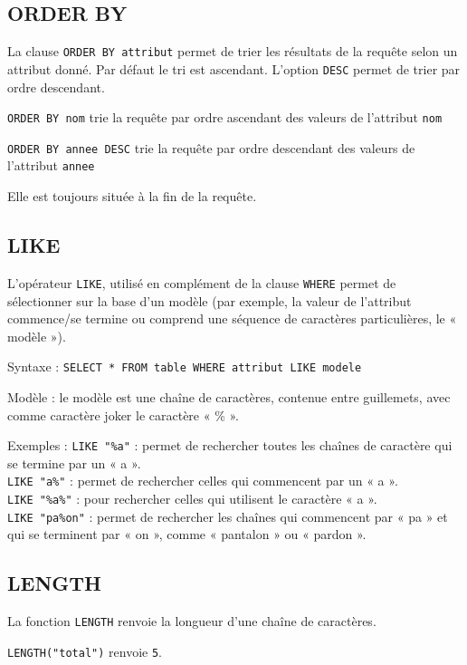 \subsection{ORDER BY}

La clause \verb|ORDER BY attribut| permet de trier les résultats de la requête selon un attribut donné. Par défaut le tri est ascendant. L'option \verb|DESC| permet de trier par ordre descendant.

\verb|ORDER BY nom| trie la requête par ordre ascendant des valeurs de l'attribut \verb|nom|

\verb|ORDER BY annee DESC| trie la requête par ordre descendant des valeurs de l'attribut \verb|annee|

Elle est toujours située à la fin de la requête.

\subsection{LIKE}

L'opérateur \verb|LIKE|, utilisé en complément de la clause \verb|WHERE| permet de sélectionner sur la base d'un modèle (par exemple, la valeur de l'attribut commence/se termine ou comprend une séquence de caractères particulières, le « modèle »). 

Syntaxe : \verb|SELECT * FROM table WHERE attribut LIKE modele|

Modèle : le modèle est une chaîne de caractères, contenue entre guillemets, avec comme caractère joker le caractère « \% ». 

Exemples :
\verb|LIKE "%a"| : permet de rechercher toutes les chaînes de caractère qui se termine par un « a ».\\
\verb|LIKE "a%"| : permet de rechercher celles qui commencent par un « a ».\\
\verb|LIKE "%a%"| : pour rechercher celles qui utilisent le caractère « a ».\\
\verb|LIKE "pa%on"| : permet de rechercher les chaînes qui commencent par « pa » et qui se terminent par « on », comme « pantalon » ou « pardon ».

\subsection{LENGTH}

La fonction \verb|LENGTH| renvoie la longueur d'une chaîne de caractères. 

\verb|LENGTH("total")| renvoie \verb|5|.

